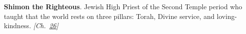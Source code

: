 \textbf{Shimon the Righteous}. Jewish High Priest of the Second Temple period who taught that the world rests on three pillars: Torah, Divine service, and loving-kindness. \emph{[Ch.~\hyperref[ch:jewishcalendar]{26}]}

